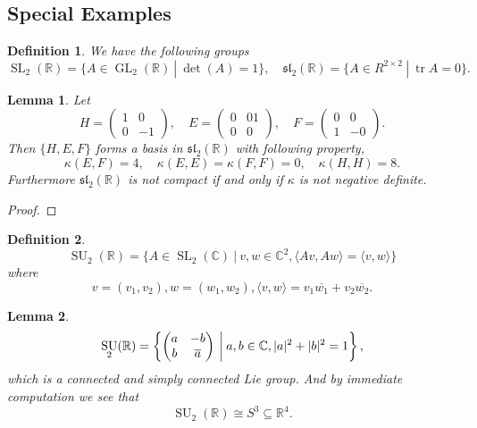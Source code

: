 \documentclass{article}
\newtheorem{definition}{Definition}[section]
\newtheorem{lemma}{Lemma}[section]
\numberwithin{equation}{section}
\DeclareMathOperator{\GL}{GL}
\DeclareMathOperator{\SL}{SL}
\DeclareMathOperator{\SU}{SU}
\DeclareMathOperator{\tr}{tr}
\begin{document}
\subsection{Special Examples}

\begin{definition}
We have the following groups
\begin{equation*}
\SL_2(\mathbb{R}) = \{A\in\GL_2(\mathbb{R})\:|\: \det(A) = 1\}, \quad \mathfrak{sl}_2(\mathbb{R})=\{A\in R^{2\times 2}\:|\: \tr A = 0\}.
\end{equation*}
\end{definition}

\begin{lemma}
Let 
\begin{equation*}
H = \begin{pmatrix} 1&0\\0&-1\end{pmatrix},\quad E=\begin{pmatrix} 0&01\\0&0\end{pmatrix},\quad F=\begin{pmatrix} 0&0\\1&-0\end{pmatrix}.
\end{equation*}
Then $\{H,E,F\}$ forms a basis in $\mathfrak{sl}_2(\mathbb{R})$ with following property,
\begin{equation*}
\kappa(E,F) = 4,\quad\kappa(E,E)=\kappa(F,F)=0,\quad\kappa(H,H) = 8.
\end{equation*}
Furthermore $\mathfrak{sl}_2(\mathbb{R})$ is not compact if and only if $\kappa $ is not negative definite.
\end{lemma}

\begin{proof}
\end{proof}

\begin{definition}
\begin{equation*}
\SU_2(\mathbb{R})=\{A\in\SL_2(\mathbb{C})\:|\: v,w\in\mathbb{C}^2, \langle Av,Aw\rangle = \langle v,w\rangle\}
\end{equation*}
where
\begin{equation*}
v = (v_1,v_2), w = (w_1,w_2), \langle v,w\rangle = v_1\overline{w_1}+v_2\overline{w_2}.
\end{equation*}
\end{definition}

\begin{lemma}
\begin{equation*}
\SU_2(\mathbb{R}) = \left\{\begin{pmatrix}a&-b\\ b&\overline{a}\end{pmatrix}\:\bigg{|}\: a,b\in\mathbb{C}, |a|^2+|b|^2 = 1\right\},
\end{equation*}
which is a connected and simply connected Lie group. And by immediate computation we see that 
\begin{equation*}
\SU_2(\mathbb{R})\cong S^3\subseteq\mathbb{R}^4.
\end{equation*}
\end{lemma}
\end{document}
